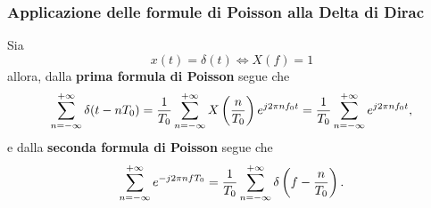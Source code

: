 \documentclass[12pt,oneside,openany]{memoir}
\numberwithin{equation}{subsection}
\begin{document}

\subsubsection{Applicazione delle formule di Poisson alla Delta di Dirac}
Sia
\[
    x(t) = \delta(t) \iff X(f) = 1
\]
allora, dalla \textbf{prima formula di Poisson} segue che
\[
    \sum\displaylimits_{n = -\infty}^{+\infty} \delta(t - nT_0) = \frac{1}{T_0}
    \sum\displaylimits_{n = -\infty}^{+\infty} X\left(\frac{n}{T_0}\right)
    e^{j 2 \pi n f_0 t} = \frac{1}{T_0}
    \sum\displaylimits_{n = -\infty}^{+\infty} e^{j 2 \pi n f_0 t},
\]
e dalla \textbf{seconda formula di Poisson} segue che
\[
    \sum\displaylimits_{n = -\infty}^{+\infty} e^{-j 2 \pi n f T_0} =
    \frac{1}{T_0} \sum\displaylimits_{n = -\infty}^{+\infty} \delta\left(f -
    \frac{n}{T_0}\right).
\]


\newpage
\end{document}
